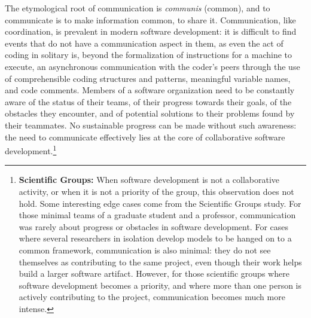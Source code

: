 The etymological root of communication is \emph{communis} (common), and to communicate is to make information common, to share it. Communication, like coordination, is prevalent in modern software development: it is difficult to find events that do not have a communication aspect in them, as even the act of coding in solitary is, beyond the formalization of instructions for a machine to execute, an asynchronous communication with the coder's peers through the use of comprehensible coding structures and patterns, meaningful variable names, and code comments. Members of a software organization need to be constantly aware of the status of their teams, of their progress towards their goals, of the obstacles they encounter, and of potential solutions to their problems found by their teammates. No sustainable progress can be made without such awareness: the need to communicate effectively lies at the core of collaborative software development.\footnote{\textbf{Scientific Groups:} When software development is not a collaborative activity, or when it is not a priority of the group, this observation does not hold. Some interesting edge cases come from the Scientific Groups study. For those minimal teams of a graduate student and a professor, communication was rarely about progress or obstacles in software development. For cases where several researchers in isolation develop models to be hanged on to a common framework, communication is also minimal: they do not see themselves as contributing to the same project, even though their work helps build a larger software artifact. However, for those scientific groups where software development becomes a priority, and where more than one person is actively contributing to the project, communication becomes much more intense.}

